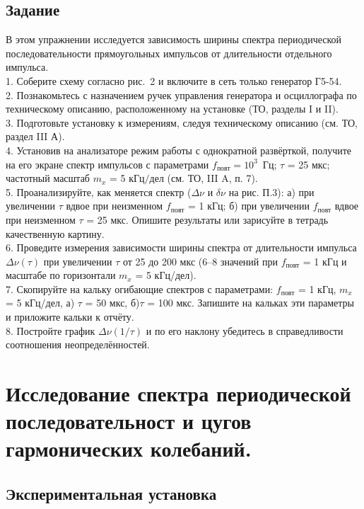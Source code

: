 \subsection{\label{sec:level2}Задание}

В этом упражнении исследуется зависимость ширины спектра периодической последовательности прямоугольных импульсов от длительности отдельного импульса.\\
1. Соберите схему согласно рис.~2 и включите в сеть только генератор Г5-54.\\
2. Познакомьтесь с назначением ручек управления генератора и осциллографа по техническому описанию, расположенному на установке (ТО,
разделы I и II).\\
3. Подготовьте установку к измерениям, следуя техническому описанию
(см. ТО, раздел III А).\\
4. Установив на анализаторе режим работы с однократной развёрткой, получите на его экране спектр импульсов с параметрами $f_{\text{повт}} = 10^3$~Гц;
$\tau$ = 25 мкс; частотный масштаб $m_x$ = 5 кГц$/$дел (см. ТО, III A, п. 7).\\
5. Проанализируйте, как меняется спектр ($\Delta{\nu}$ и $\delta{\nu}$ на рис. П.3): а) при
увеличении $\tau$ вдвое при неизменном $f_{\text{повт}}$ = 1 кГц; б) при увеличении
$f_{\text{повт}}$ вдвое при неизменном $\tau$ = 25 мкс. Опишите результаты или зарисуйте в тетрадь качественную картину.\\
6. Проведите измерения зависимости ширины спектра от длительности импульса $\Delta{\nu(\tau)}$ при увеличении $\tau$ от 25 до 200 мкс (6–8 значений при $f_{\text{повт}}$ = 1 кГц и масштабе по горизонтали $m_x$ = 5 кГц/дел).\\
7. Скопируйте на кальку огибающие спектров с параметрами: $f_{\text{повт}}$ = 1 кГц,
$m_x$ = 5 кГц/дел, а) $\tau$ = 50 мкс, б)$\tau$ = 100 мкс. Запишите на кальках эти
параметры и приложите кальки к отчёту.\\
8. Постройте график $\Delta{\nu(1/\tau)}$ и по его наклону убедитесь в справедливости
соотношения неопределённостей.

\section{\label{sec:level1}Исследование спектра
периодической последовательност
и цугов
гармонических
колебаний.}

\subsection{\label{sec:level2}Экспериментальная установка}

